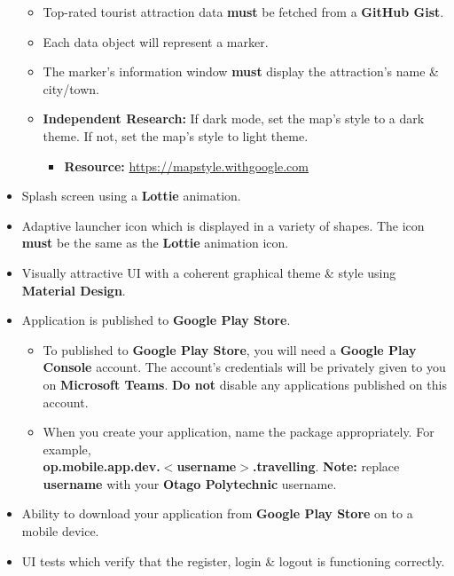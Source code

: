 \documentclass{article}
\begin{document}
\begin{itemize}
\begin{itemize}
	      	\item Top-rated tourist attraction data \textbf{must} be fetched from a \textbf{GitHub Gist}.
	      	\item Each data object will represent a marker.
	      	\item The marker's information window \textbf{must} display the attraction's name \& city/town.
	      	\item \textbf{Independent Research:} If dark mode, set the map's style to a dark theme. If not, set the map's style to light theme.
	      	\begin{itemize}
				  \item \textbf{Resource:} \small\href{https://mapstyle.withgoogle.com}{https://mapstyle.withgoogle.com}
			  \end{itemize}
	      \end{itemize}
	\item Splash screen using a \textbf{Lottie} animation.
	\item Adaptive launcher icon which is displayed in a variety of shapes. The icon \textbf{must} be the same as the \textbf{Lottie} animation icon.
	\item Visually attractive UI with a coherent graphical theme \& style using \textbf{Material Design}.
	\item Application is published to \textbf{Google Play Store}.
	      \begin{itemize}
	      	\item To published to \textbf{Google Play Store}, you will need a \textbf{Google Play Console} account. The account's credentials will be privately given to you on \textbf{Microsoft Teams}. \textbf{Do not} disable any applications published on this account.
	      	\item When you create your application, name the package appropriately. For example, \\ \textbf{op.mobile.app.dev.$<$username$>$.travelling}. \textbf{Note:} replace \textbf{username} with your \textbf{Otago Polytechnic} username.
	      \end{itemize}
	\item Ability to download your application from \textbf{Google Play Store} on to a mobile device.
	\item UI tests which verify that the register, login \& logout is functioning correctly.
\end{itemize}
\end{document}
